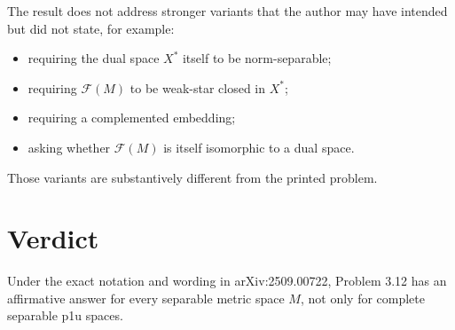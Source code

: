\documentclass[11pt]{article}
\newcommand{\F}{\mathcal F}
\begin{document}
The result does not address stronger variants that the author may have
intended but did not state, for example:

\begin{itemize}
\item requiring the dual space \(X^*\) itself to be norm-separable;
\item requiring \(\F(M)\) to be weak-star closed in \(X^*\);
\item requiring a complemented embedding;
\item asking whether \(\F(M)\) is itself isomorphic to a dual space.
\end{itemize}

Those variants are substantively different from the printed problem.

\section*{Verdict}

Under the exact notation and wording in arXiv:2509.00722, Problem 3.12 has an
affirmative answer for every separable metric space \(M\), not only for
complete separable p1u spaces.
\end{document}
